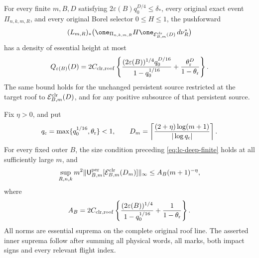 \begin{theorem}
\label{thm:lc-deep-payment}
For every finite $m,B,D$ satisfying
$2\varepsilon(B)q_0^{D/4}\le\delta_*$, every original exact event
$\Pi_{n,k,m,R}$, and every original Borel selector $0\le H\le1$,
the pushforward
\[
 (L_{m,R})_*\bigl(\one_{\Pi_{n,k,m,R}}H
                \one_{\mathcal E^{\rm clr}_{B,m}(D)}\,d\nu_R^*\bigr)
\]
has a density of essential height at most
\begin{equation}\label{eq:lc-deep-finite}
 Q_{\varepsilon(B)}(D)
 =2C_{\rm clr,roof}\left\{
   \frac{(2\varepsilon(B))^{1/4}q_0^{D/16}}{1-q_0^{1/16}}
                   +\frac{\theta_{\rm r}^{D}}{1-\theta_{\rm r}}
                    \right\}.
\end{equation}
The same bound holds for the unchanged persistent source restricted
at the target roof to $\mathcal E^{\rm clr}_{B,m}(D)$, and for any
positive subsource of that persistent source.

Fix $\eta>0$, and put
\begin{equation}\label{eq:lc-log-depth}
 q_{\rm c}=\max\{q_0^{1/16},\theta_{\rm r}\}<1,\qquad
 D_m=\left\lceil\frac{(2+\eta)\log(m+1)}{|\log q_{\rm c}|}\right\rceil.
\end{equation}
For every fixed outer $B$, the size condition preceding
\eqref{eq:lc-deep-finite} holds at all sufficiently large $m$, and
\begin{equation}\label{eq:lc-normalized-rate}
 \sup_{R,n,k}m^2
 \|\mathsf U_{B,m}^{\rm per}[\mathcal E^{\rm clr}_{B,m}(D_m)]\|_\infty
 \le A_B(m+1)^{-\eta},
\end{equation}
where
\begin{equation}\label{eq:lc-AB}
 A_B=2C_{\rm clr,roof}\left\{
       \frac{(2\varepsilon(B))^{1/4}}{1-q_0^{1/16}}
                              +\frac1{1-\theta_{\rm r}}\right\}.
\end{equation}
All norms are essential suprema on the complete original roof line.
The asserted inner suprema follow after summing all physical words,
all marks, both impact signs and every relevant flight index.
\end{theorem}
